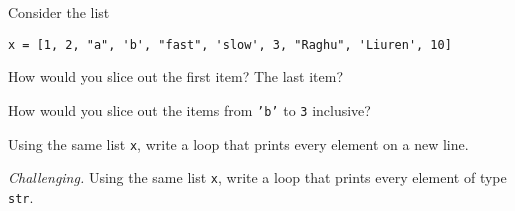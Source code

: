\documentclass[11pt]{exam}
\begin{document}
\begin{questions}
\item Consider the list
\begin{verbatim}
x = [1, 2, "a", 'b', "fast", 'slow', 3, "Raghu", 'Liuren', 10]
\end{verbatim}
\begin{parts}
\item How would you slice out the first item?  The last item?
\item How would you slice out the items from {\tt 'b'} to {\tt 3} inclusive?
\end{parts}

\item Using the same list {\tt x}, write a loop that prints every element on a new line.

\item {\it Challenging.\/}
Using the same list {\tt x}, write a loop that prints every element of type {\tt str}.


\begin{comment} 
\item Suppose the current price of corn is \$1.20.
The price is set to increase by 10 cents every weekday until it hits \$2.50.
(Nothing happens on weekends.)
At that point it will switch directions and decrease by 10 cents a day. 
Finish the code below to print the price of corn every day until it reaches \$2.50.
\begin{verbatim}
days = ["M", "T", "W", "Th", "F"]
starting_price = 1.20
current_price = starting_price
while True:
for day in days:
    current_price = current_price + 0.10
    print("The price on ", day, "is ", current_price)
if current_price == 2.50:
    break
\end{verbatim}
\end{comment}






\end{questions}
\end{document}
